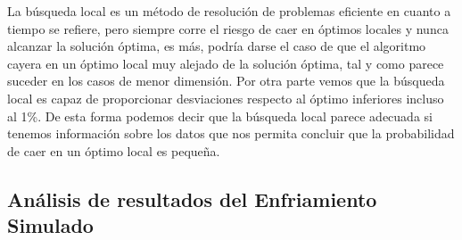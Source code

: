 \documentclass[11pt,a4paper]{article}
\begin{document}
	\noindent La búsqueda local es un método de resolución de problemas eficiente en cuanto a tiempo se refiere, pero siempre corre el riesgo de caer en óptimos locales y nunca alcanzar la solución óptima, es más, podría darse el caso de que el algoritmo cayera en un óptimo local muy alejado de la solución óptima, tal y como parece suceder en los casos de menor dimensión. Por otra parte vemos que la búsqueda local es capaz de proporcionar desviaciones respecto al óptimo inferiores incluso al 1\%. De esta forma podemos decir que la búsqueda local parece adecuada si tenemos información sobre los datos que nos permita concluir que la probabilidad de caer en un óptimo local es pequeña.\\

	\FloatBarrier
	
	\subsection{Análisis de resultados del Enfriamiento Simulado}
	
\end{document}
